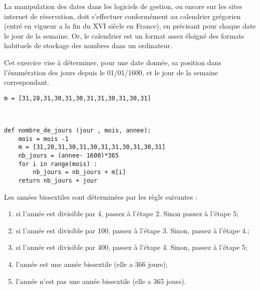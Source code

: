 \ifprof 
\else
La manipulation des dates dans les logiciels de gestion, ou encore sur les sites internet de réservation, doit s'effectuer conformément au calendrier grégorien (entré en vigueur a la fin du XVI siècle en France), en précisant pour chaque date le jour de la semaine. Or, le calendrier est un format assez éloigné des formats habituels de stockage des nombres dans un ordinateur.

Cet exercice vise à déterminer, pour une date donnée, sa position dans l'énumération des jours depuis le 01/01/1600, et le jour de la semaine correspondant.
\fi


\begin{lstlisting}
m = [31,28,31,30,31,30,31,31,30,31,30,31]
\end{lstlisting}
\ifprof 
\begin{corrige}~\\ \vspace{-.5cm}
\begin{lstlisting}
def nombre_de_jours (jour , mois, annee):
    mois = mois -1 
    m = [31,28,31,30,31,30,31,31,30,31,30,31]
    nb_jours = (annee- 1600)*365
    for i in range(mois) :
        nb_jours = nb_jours + m[i]
    return nb_jours + jour
\end{lstlisting}
\end{corrige}
\else
\fi

\ifprof 
\else
Les années bissextiles sont déterminées par les règle suivantes :
\begin{enumerate}
\item si l'année est divisible par 4, passez à l'étape 2. Sinon passez à l'étape 5;
\item si l'année est divisible par 100, passez à l'étape 3. Sinon, passez à l'étape 4.;
\item si l'année est divisible par 400, passez à l'étape 4. Sinon, passez à l'étape 5;
\item l'année est une année bissextile (elle a 366 jours);
\item l'année n'est pas une année bissextile (elle a 365 jours).
\end{enumerate}
\fi

